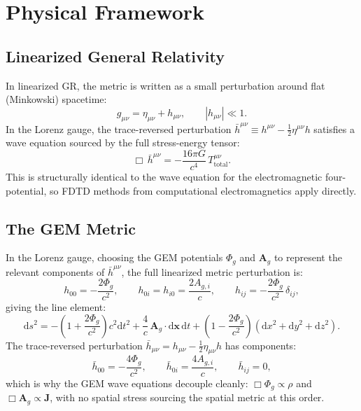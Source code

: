 \documentclass[11pt,a4paper]{article}
\newcommand{\vv}[1]{\mathbf{#1}}
\newcommand{\Phig}{\Phi_g}
\newcommand{\Ag}{\vv{A}_g}
\newcommand{\dd}{\mathrm{d}}
\begin{document}
\section{Physical Framework}

\subsection{Linearized General Relativity}

In linearized GR, the metric is written as a small perturbation around flat (Minkowski) spacetime:
\begin{equation}
  g_{\mu\nu} = \eta_{\mu\nu} + h_{\mu\nu}, \qquad |h_{\mu\nu}| \ll 1.
\end{equation}
In the Lorenz gauge, the trace-reversed perturbation $\bar{h}^{\mu\nu} \equiv h^{\mu\nu} - \tfrac{1}{2}\eta^{\mu\nu}h$ satisfies a wave equation sourced by the full stress-energy tensor:
\begin{equation}
  \Box\,\bar{h}^{\mu\nu} = -\frac{16\pi G}{c^4}\,T^{\mu\nu}_{\mathrm{total}}.
\end{equation}
This is structurally identical to the wave equation for the electromagnetic four-potential, so FDTD methods from computational electromagnetics apply directly.

\subsection{The GEM Metric}
\label{sec:gem_metric}

In the Lorenz gauge, choosing the GEM potentials $\Phig$ and $\Ag$ to represent the relevant components of $\bar{h}^{\mu\nu}$, the full linearized metric perturbation is:
\begin{equation}
\label{eq:gem_metric}
  h_{00} = -\frac{2\Phig}{c^2}, \qquad
  h_{0i} = h_{i0} = \frac{2A_{g,i}}{c}, \qquad
  h_{ij} = -\frac{2\Phig}{c^2}\,\delta_{ij},
\end{equation}
giving the line element:
\begin{equation}
\label{eq:gem_line_element}
  \dd s^2 = -\!\left(1+\frac{2\Phig}{c^2}\right)c^2\dd t^2
            + \frac{4}{c}\,\Ag\cdot\dd\vv{x}\,\dd t
            + \left(1-\frac{2\Phig}{c^2}\right)\!\left(\dd x^2+\dd y^2+\dd z^2\right).
\end{equation}
The trace-reversed perturbation $\bar{h}_{\mu\nu} = h_{\mu\nu} - \tfrac{1}{2}\eta_{\mu\nu}h$ has components:
\begin{equation}
  \bar{h}_{00} = -\frac{4\Phig}{c^2}, \qquad
  \bar{h}_{0i} = \frac{4A_{g,i}}{c}, \qquad
  \bar{h}_{ij} = 0,
\end{equation}
which is why the GEM wave equations decouple cleanly: $\Box\Phig \propto \rho$ and $\Box\Ag \propto \vv{J}$, with no spatial stress sourcing the spatial metric at this order.
\end{document}
